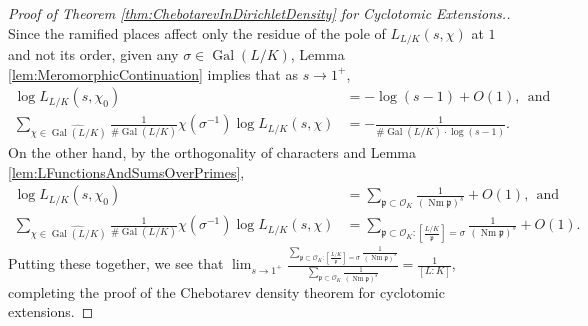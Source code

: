 \documentclass[12pt]{amsart}
\theoremstyle{definition}
\theoremstyle{remark}
\numberwithin{equation}{section}
\newcommand{\cO}{\mathcal O}
\newcommand{\fkp}{\mathfrak p}
\DeclareMathOperator{\norm}{Nm}
\newcommand{\inv}{^{-1}}
\newcommand{\artin}[2]{\left[ \frac{#1}{#2}\right]}
\DeclareMathOperator{\Gal}{Gal}
\begin{document}
\begin{proof}[Proof of Theorem \ref{thm:ChebotarevInDirichletDensity} for Cyclotomic Extensions.]
Since the ramified places affect only the residue of the pole of $L_{L/K}(s,\chi)$ at $1$ and not its order, given any $\sigma \in \Gal(L/K)$, Lemma \ref{lem:MeromorphicContinuation} implies that as $s \to 1^+$,
\begin{align}
\log L_{L/K}(s,\chi_{0}) & = -\log(s-1) + O(1), \ \ \text{and}\\
\sum_{\chi \in \widehat{\Gal(L/K)}}\frac{1}{\# \Gal(L/K)} \chi(\sigma\inv) \log L_{L/K}(s, \chi) & = - \frac{1}{\# \Gal(L/K) \cdot \log(s-1)}.
\end{align}
On the other hand, by the orthogonality of characters and Lemma \ref{lem:LFunctionsAndSumsOverPrimes},
\begin{align}
\log L_{L/K}(s,\chi_{0}) & = \sum_{\fkp \subset \cO_{K}} \frac{1}{(\norm \fkp)^s} + O(1), \ \ \text{and} \\
\sum_{\chi \in \widehat{\Gal(L/K)}}\frac{1}{\# \Gal(L/K)} \chi(\sigma\inv)  \log L_{L/K}(s, \chi) & = \sum_{\fkp \subset \cO_{K}: \artin{L/K}{\fkp} = \sigma} \frac{1}{(\norm \fkp)^s} + O(1).
\end{align}
Putting these together, we see that $\displaystyle \lim_{s \to 1^{+}} \frac{\sum_{\fkp \subset \cO_{K}: \artin{L/K}{\fkp} = \sigma} \frac{1}{(\norm \fkp)^s}}{\sum_{\fkp \subset \cO_{K}} \frac{1}{(\norm \fkp)^s}} = \frac{1}{[L:K]}$, completing the proof of the Chebotarev density theorem for cyclotomic extensions.
\end{proof}
\end{document}

